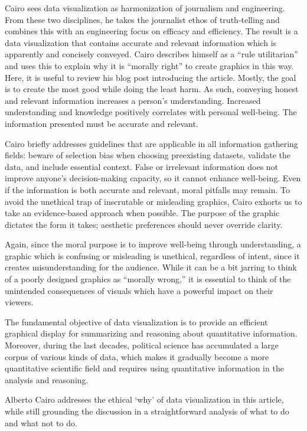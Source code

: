 \documentclass[]{book}
\theoremstyle{definition}
\theoremstyle{definition}
\theoremstyle{definition}
\theoremstyle{remark}
\begin{document}
Cairo sees data visualization as harmonization of journalism and
engineering. From these two disciplines, he takes the journalist ethos
of truth-telling and combines this with an engineering focus on efficacy
and efficiency. The result is a data visualization that contains
accurate and relevant information which is apparently and concisely
conveyed. Cairo describes himself as a ``rule utilitarian'' and uses
this to explain why it is ``morally right'' to create graphics in this
way. Here, it is useful to review his blog post introducing the article.
Mostly, the goal is to create the most good while doing the least harm.
As such, conveying honest and relevant information increases a person's
understanding. Increased understanding and knowledge positively
correlates with personal well-being. The information presented must be
accurate and relevant.

Cairo briefly addresses guidelines that are applicable in all
information gathering fields: beware of selection bias when choosing
preexisting datasets, validate the data, and include essential context.
False or irrelevant information does not improve anyone's
decision-making capacity, so it cannot enhance well-being. Even if the
information is both accurate and relevant, moral pitfalls may remain. To
avoid the unethical trap of inscrutable or misleading graphics, Cairo
exhorts us to take an evidence-based approach when possible. The purpose
of the graphic dictates the form it takes; aesthetic preferences should
never override clarity.

Again, since the moral purpose is to improve well-being through
understanding, a graphic which is confusing or misleading is unethical,
regardless of intent, since it creates misunderstanding for the
audience. While it can be a bit jarring to think of a poorly designed
graphics as ``morally wrong,'' it is essential to think of the
unintended consequences of visuals which have a powerful impact on their
viewers.

The fundamental objective of data visualization is to provide an
efficient graphical display for summarizing and reasoning about
quantitative information. Moreover, during the last decades, political
science has accumulated a large corpus of various kinds of data, which
makes it gradually become a more quantitative scientific field and
requires using quantitative information in the analysis and reasoning.

Alberto Cairo addresses the ethical `why' of data visualization in this
article, while still grounding the discussion in a straightforward
analysis of what to do and what not to do.
\end{document}
